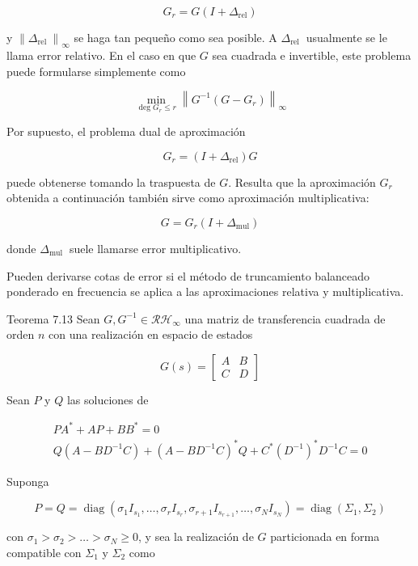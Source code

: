 $$
G_{r}=G\left(I+\Delta_{\mathrm{rel}}\right)
$$

y $\left\|\Delta_{\text {rel }}\right\|_{\infty}$ se haga tan pequeño como sea posible. A $\Delta_{\text {rel }}$ usualmente se le llama error relativo. En el caso en que $G$ sea cuadrada e invertible, este problema puede formularse simplemente como

$$
\min _{\operatorname{deg} G_{r} \leq r}\left\|G^{-1}\left(G-G_{r}\right)\right\|_{\infty}
$$

Por supuesto, el problema dual de aproximación

$$
G_{r}=\left(I+\Delta_{\mathrm{rel}}\right) G
$$

puede obtenerse tomando la traspuesta de $G$. Resulta que la aproximación $G_{r}$ obtenida a continuación también sirve como aproximación multiplicativa:

$$
G=G_{r}\left(I+\Delta_{\mathrm{mul}}\right)
$$

donde $\Delta_{\text {mul }}$ suele llamarse error multiplicativo.

Pueden derivarse cotas de error si el método de truncamiento balanceado ponderado en frecuencia se aplica a las aproximaciones relativa y multiplicativa.

Teorema 7.13 Sean $G, G^{-1} \in \mathcal{R H}_{\infty}$ una matriz de transferencia cuadrada de orden $n$ con una realización en espacio de estados

$$
G(s)=\left[\begin{array}{l|l}
A & B \\
\hline C & D
\end{array}\right]
$$

Sean $P$ y $Q$ las soluciones de


\begin{gather*}
P A^{*}+A P+B B^{*}=0  \tag{7.23}\\
Q\left(A-B D^{-1} C\right)+\left(A-B D^{-1} C\right)^{*} Q+C^{*}\left(D^{-1}\right)^{*} D^{-1} C=0 \tag{7.24}
\end{gather*}


Suponga

$$
P=Q=\operatorname{diag}\left(\sigma_{1} I_{s_{1}}, \ldots, \sigma_{r} I_{s_{r}}, \sigma_{r+1} I_{s_{r+1}}, \ldots, \sigma_{N} I_{s_{N}}\right)=\operatorname{diag}\left(\Sigma_{1}, \Sigma_{2}\right)
$$

con $\sigma_{1}>\sigma_{2}>\ldots>\sigma_{N} \geq 0$, y sea la realización de $G$ particionada en forma compatible con $\Sigma_{1}$ y $\Sigma_{2}$ como

